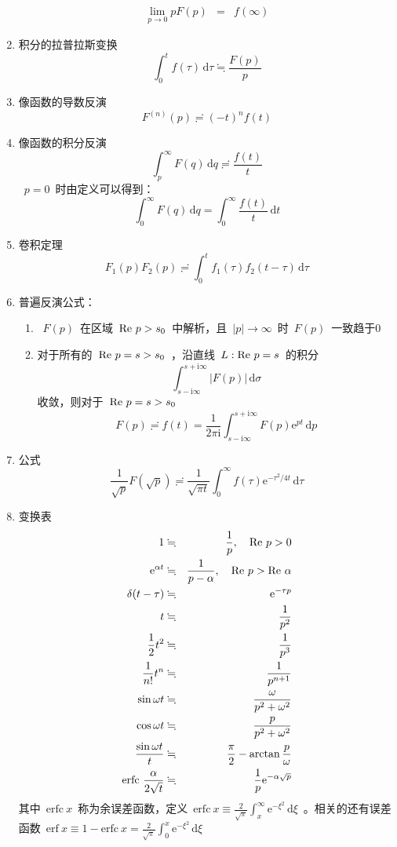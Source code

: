 \documentclass[12pt,a4paper]{article}
\newcommand\diff{\,\mathrm{d}}
\renewcommand{\[}{\ $\displaystyle}
\renewcommand{\]}{$\ }%
\newcommand\mi{\mathrm{i}}
\newcommand\e{\mathrm{e}}
\begin{document}
\begin{enumerate}
\begin{eqnarray*}
	   	 \lim_{p\to 0}pF(p) &=& f(\infty)
	   	\end{eqnarray*}
	   \item 积分的拉普拉斯变换
	   	$$
	   	  \int_0^tf(\tau)\diff\tau \fallingdotseq \frac{F(p)}{p}
	   	$$
	   \item 像函数的导数反演
	   $$
	     F^{(n)}(p) \risingdotseq (-t)^nf(t)
	   $$
	   \item 像函数的积分反演
	   $$
	     \int_p^\infty F(q)\diff q \risingdotseq \frac{f(t)}{t}
	   $$
	   \[p=0\]时由定义可以得到：
	   $$
	     \int_0^\infty F(q)\diff q = \int_0^\infty \frac{f(t)}{t}\diff t
	   $$
	   \item 卷积定理
	   	$$
	   	  F_1(p)F_2(p) \risingdotseq \int_0^t f_1(\tau)f_2(t-\tau)\diff\tau
	   	$$
	   \item 普遍反演公式：
	    \begin{enumerate}
	     \item \[F(p)\]在区域\[\re p > s_0\]中解析，且\[|p|\to\infty\]时\[F(p)\]一致趋于0
	     \item 对于所有的\[\re p = s>s_0\]，沿直线\[L:\re p = s\]的积分
	      $$
	        \int_{s-\mi\infty}^{s+\mi\infty}|F(p)|\diff\sigma
	      $$
	     收敛，则对于\[\re p = s>s_0\]
	     $$
	       F(p)\risingdotseq f(t) = \frac 1{2\pi\mi}\int_{s-\mi\infty}^{s+\mi\infty}F(p)\e^{pt}\diff p
	     $$
	    \end{enumerate}
	   \item 公式
	    $$
	      \frac{1}{\sqrt{p}}F(\sqrt{p})\risingdotseq \frac{1}{\sqrt{\pi t}}\int_0^\infty f(\tau)\e^{-\tau^2/4t}\diff\tau
	    $$
	   \item 变换表
	   	\begin{eqnarray*}
	   	  1 &\fallingdotseq & \frac 1p ,\quad \re p>0 \\
	   	  \e^{\alpha t} &\fallingdotseq & \frac{1}{p-\alpha} , \quad \re p>\re \alpha \\
	   	  \delta(t-\tau) &\fallingdotseq & \e^{-\tau p} \\
	   	  t &\fallingdotseq & \frac 1{p^2}\\
	   	  \frac 12 t^2 &\fallingdotseq & \frac{1}{p^3} \\
	   	  \frac 1{n!} t^n &\fallingdotseq & \frac 1{p^{n+1}}\\
	   	  \sin \omega t &\fallingdotseq & \frac{\omega}{p^2+\omega^2} \\
	   	  \cos \omega t &\fallingdotseq & \frac{p}{p^2+\omega^2} \\
	   	  \frac{\sin\omega t}{t} &\fallingdotseq & \frac \pi 2 - \arctan \frac p\omega \\
	   	  \mathrm{erfc}~ \frac{\alpha}{2\sqrt t} &\fallingdotseq & \frac 1p \e^{-\alpha\sqrt{p}}
	   	\end{eqnarray*}
	   	其中\[\mathrm{erfc}~x\]称为余误差函数，定义\[\mathrm{erfc}~x \equiv \frac{2}{\sqrt{\pi}}\int_x^\infty \e^{-\xi^2}\diff\xi\]。相关的还有误差函数\[\mathrm{erf}~x \equiv 1-\mathrm{erfc}~x = \frac{2}{\sqrt{\pi}}\int_0^x \e^{-\xi^2}\diff\xi\]
	 \end{enumerate}
	 
\end{document}
